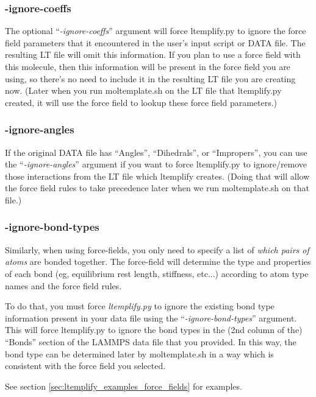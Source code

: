 \documentclass[11pt]{article}
\begin{document}
\subsubsection*{-ignore-coeffs}

The optional ``\textit{-ignore-coeffs}'' argument will
force ltemplify.py to ignore the  force field parameters
that it encountered in the user's input script or DATA file.
The resulting LT file will omit this information.
If you plan to use a force field with this molecule, then this information
will be present in the force field you are using, so there's no need
to include it in the resulting LT file you are creating now.
(Later when you run moltemplate.sh on the LT file that ltemplify.py
created, it will use the force field to lookup these force field parameters.)

\subsubsection*{-ignore-angles}

If the original DATA file has ``Angles'', ``Dihedrals'', or ``Impropers'',
you can use the ``\textit{-ignore-angles}'' argument if you want to force
ltemplify.py to ignore/remove those interactions from the LT
file which ltemplify creates.
(Doing that will allow the force field rules to take precedence
later when we run moltemplate.sh on that file.)

\subsubsection*{-ignore-bond-types}

Similarly, when using force-fields, you only need to specify a
list of \textit{which pairs of atoms} are bonded together.
The force-field will determine the type and
properties of each bond (eg, equilibrium rest length, stiffness, etc...)
according to atom type names and the force field rules.

To do that, you must force \textit{ltemplify.py} to ignore the existing
bond type information present in your data file using the
``\textit{-ignore-bond-types}'' argument.
This will force ltemplify.py to ignore the bond types in the
(2nd column of the) ``Bonds'' section of the LAMMPS data file that you provided.
In this way, the bond type can be determined later by moltemplate.sh
in a way which is consistent with the force field you selected.


See section \ref{sec:ltemplify_examples_force_fields} for examples.
\end{document}

